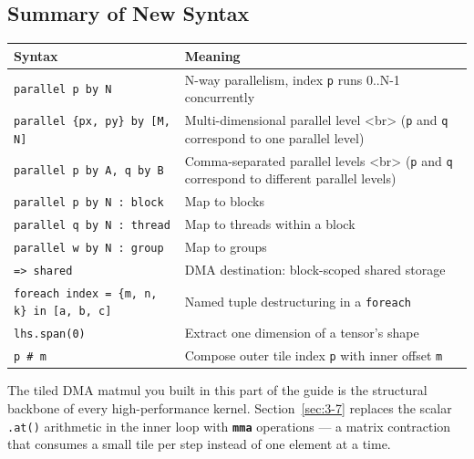 \subsection*{Summary of New Syntax}

\begin{table}[htbp]
\centering\small
\begin{tabularx}{\linewidth}{@{}lX@{}}
\toprule
\textbf{Syntax} & \textbf{Meaning} \\
\midrule
\texttt{parallel p by N} & N-way parallelism, index \texttt{p} runs 0..N-1 concurrently \\
\texttt{parallel \{px, py\} by [M, N]} & Multi-dimensional parallel level \textless{}br\textgreater{} (\texttt{p} and \texttt{q} correspond to one parallel level) \\
\texttt{parallel p by A, q by B} & Comma-separated parallel levels \textless{}br\textgreater{} (\texttt{p} and \texttt{q} correspond to different parallel levels) \\
\texttt{parallel p by N :\allowbreak{} block} & Map to blocks \\
\texttt{parallel q by N :\allowbreak{} thread} & Map to threads within a block \\
\texttt{parallel w by N :\allowbreak{} group} & Map to groups \\
\texttt{=\textgreater{} shared} & DMA destination: block-scoped shared storage \\
\texttt{foreach index = \{m, n, k\} in [a, b, c]} & Named tuple destructuring in a \texttt{foreach} \\
\texttt{lhs.span(0)} & Extract one dimension of a tensor's shape \\
\texttt{p \# m} & Compose outer tile index \texttt{p} with inner offset \texttt{m} \\
\bottomrule
\end{tabularx}
\end{table}

The tiled DMA matmul you built in this part of the guide is the structural backbone of every high-performance kernel. Section~\ref{sec:3-7} replaces the scalar \texttt{.at()} arithmetic in the inner loop with \textbf{\texttt{mma}} operations --- a matrix contraction that consumes a small tile per step instead of one element at a time.

